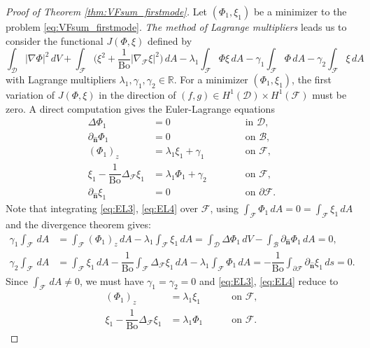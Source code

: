 \documentclass[letterpaper, 12pt]{amsart}
\newcommand{\bond}{\mathrm{Bo}}
\newcommand{\R}{\mathbb{R}}
\newcommand{\D}{\mathcal{D}}
\newcommand{\B}{\mathcal{B}}
\newcommand{\F}{\mathcal{F}}
\newcommand{\n}{\mathbf{\hat{n}}}
\begin{document}
\begin{proof}[Proof of Theorem \ref{thm:VFsum_firstmode}]
Let $(\Phi_1,\xi_1)$ be a minimizer to the problem \eqref{eq:VFsum_firstmode}. \emph{The method of Lagrange multipliers} leads us to consider the functional $J(\Phi,\xi)$ defined by
\[ \int_\D |\nabla\Phi|^2\, dV + \int_\F \Big(\xi^2+\dfrac{1}{\bond}|\nabla_\F\xi|^2\Big)\, dA - \lambda_1\int_\F\Phi\xi\, dA - \gamma_1\int_\F\Phi\, dA - \gamma_2\int_\F\xi\, dA \]
with Lagrange multipliers $\lambda_1, \gamma_1, \gamma_2\in\R$. 
For  a minimizer $(\Phi_1,\xi_1)$, the first variation of $J(\Phi,\xi)$ in the direction of $(f,g)\in H^1(\D)\times H^1(\F)$ must be zero. 
A direct computation gives the Euler-Lagrange equations
\begin{subequations}
\begin{alignat}{3}
\label{eq:EL1} \Delta\Phi_1 & = 0 && \qquad\textrm{ in }\D, \\
\label{eq:EL2} \partial_\n\Phi_1 & = 0 && \qquad\textrm{ on }\B, \\
\label{eq:EL3} (\Phi_1)_z & = \lambda_1\xi_1 + \gamma_1 && \qquad\textrm{ on }\F, \\
\label{eq:EL4} \xi_1 - \dfrac{1}{\bond}\Delta_\F\xi_1 & = \lambda_1\Phi_1 + \gamma_2 && \qquad\textrm{ on }\F, \\
\label{eq:EL5} \partial_\n\xi_1 & = 0 && \qquad\textrm{ on }\partial\F.
\end{alignat}
\end{subequations}
Note that integrating \eqref{eq:EL3}, \eqref{eq:EL4} over $\F$, using $\int_\F\Phi_1\, dA=0=\int_\F\xi_1\, dA$ and the divergence theorem gives:
\begin{align*}
\gamma_1\int_\F\, dA & = \int_\F (\Phi_1)_z\, dA - \lambda_1\int_\F\xi_1\, dA = \int_\D\Delta\Phi_1\, dV - \int_\B\partial_\n\Phi_1\, dA = 0, \\
\gamma_2\int_\F\, dA & = \int_\F\xi_1\, dA - \dfrac{1}{\bond}\int_\F\Delta_\F\xi_1\, dA - \lambda_1\int_\F\Phi_1\, dA = -\dfrac{1}{\bond}\int_{\partial\F}\partial_\n\xi_1\, ds = 0 . 
\end{align*}
Since $\displaystyle\int_\F\, dA\neq 0$, we must have $\gamma_1=\gamma_2=0$ and \eqref{eq:EL3}, \eqref{eq:EL4} reduce to
\begin{subequations}
\begin{alignat}{3}
(\Phi_1)_z & = \lambda_1\xi_1  && \quad\text{ on }\F, \label{eq:EL3a} \\
\xi_1 - \dfrac{1}{\bond}\Delta_\F\xi_1 & = \lambda_1\Phi_1 && \quad\text{ on }\F. \label{eq:EL4a}
\end{alignat}
\end{subequations}

\end{proof}
\end{document}
